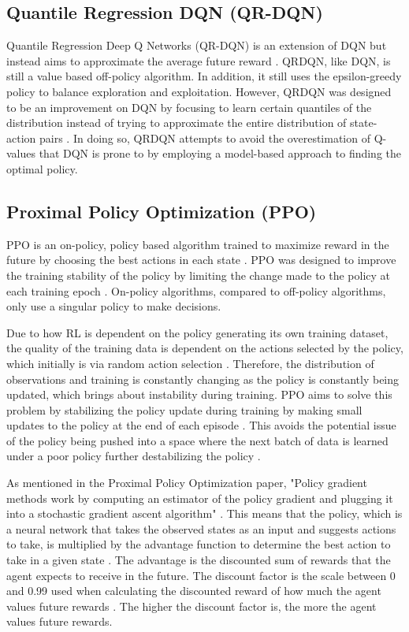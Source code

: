 \subsection{Quantile Regression DQN (QR-DQN)}

Quantile Regression Deep Q Networks (QR-DQN) is an extension of DQN but instead aims to approximate the average future reward \cite{dabney2018distributional}. QRDQN, like DQN, is still a value based off-policy algorithm. In addition, it still uses the epsilon-greedy policy to balance exploration and exploitation. However, QRDQN was designed to be an improvement on DQN by focusing to learn certain quantiles of the distribution instead of trying to approximate the entire distribution of state-action pairs \cite{dabney2018distributional}. In doing so, QRDQN attempts to avoid the overestimation of Q-values that DQN is prone to by employing a model-based approach to finding the optimal policy.

\subsection{Proximal Policy Optimization (PPO)}

PPO is an on-policy, policy based algorithm trained to maximize reward in the future by choosing the best actions in each state \cite{deepcheckRL}. PPO was designed to improve the training stability of the policy by limiting the change made to the policy at each training epoch \cite{ThomasSimonini2022A2C}. On-policy algorithms, compared to off-policy algorithms, only use a singular policy to make decisions.

Due to how RL is dependent on the policy generating its own training dataset, the quality of the training data is dependent on the actions selected by the policy, which initially is via random action selection \cite{XanderSteenbrugge2019ppo}. Therefore, the distribution of observations and training is constantly changing as the policy is constantly being updated, which brings about instability during training. PPO aims to solve this problem by stabilizing the policy update during training by making small updates to the policy at the end of each episode \cite{XanderSteenbrugge2019intro}. This avoids the potential issue of the policy being pushed into a space where the next batch of data is learned under a poor policy further destabilizing the policy \cite{XanderSteenbrugge2019ppo}.

As mentioned in the Proximal Policy Optimization paper, "Policy gradient methods work by computing an estimator of the policy gradient and plugging it into a stochastic gradient ascent algorithm" \cite{schulman2017proximal}. This means that the policy, which is a neural network that takes the observed states as an input and suggests actions to take, is multiplied by the advantage function to determine the best action to take in a given state \cite{schulman2017proximal}. The advantage is the discounted sum of rewards that the agent expects to receive in the future. The discount factor is the scale between 0 and 0.99 used when calculating the discounted reward of how much the agent values future rewards \cite{XanderSteenbrugge2019ppo}. The higher the discount factor is, the more the agent values future rewards. 

